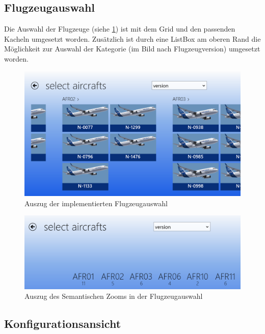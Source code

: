 \subsection{Flugzeugauswahl}
Die Auswahl der Flugzeuge (siehe \ref{aircraftSelectionImpl}) ist mit dem Grid und den passenden Kacheln umgesetzt worden. Zusätzlich ist durch eine ListBox am oberen Rand die Möglichkeit zur Auswahl der Kategorie (im Bild nach Flugzeugversion) umgesetzt worden. 
\begin{figure}[H]
\centering
\includegraphics[width=\hsize]{images/impl/select_aircrafts_impl}
\caption{Auszug der implementierten Flugzeugauswahl}
\label{aircraftSelectionImpl}
\end{figure}
\begin{figure}[H]
\centering
\includegraphics[width=\hsize]{images/impl/semantic_zoom_impl}
\caption{Auszug des Semantischen Zooms in der Flugzeugauswahl}
\label{aircraftSelectionZoomImpl}
\end{figure}

\subsection{Konfigurationsansicht}

